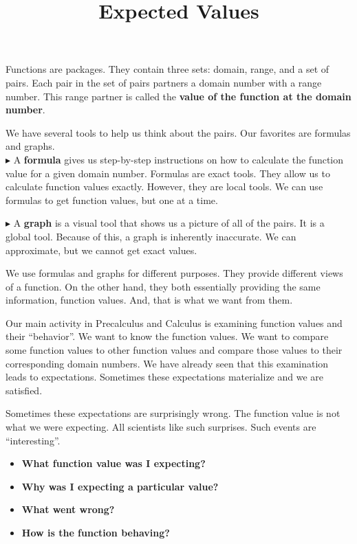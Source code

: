 \documentclass{ximera}
\title{Expected Values}
\begin{document}
\begin{abstract}

\end{abstract}
\maketitle




Functions are packages.  They contain three sets: domain, range, and a set of pairs.  Each pair in the set of pairs partners a domain number with a range number.  This range partner is called the \textbf{value of the function \textcolor{purple!85!blue}{at} the domain number}.


We have several tools to help us think about the pairs. Our favorites are formulas and graphs. \\


$\blacktriangleright$ A \textbf{\textcolor{purple!85!blue}{formula}} gives us step-by-step instructions on how to calculate the function value for a given domain number.   Formulas are exact tools. They allow us to calculate function values exactly. However, they are local tools.  We can use formulas to get function values, but one at a time.


$\blacktriangleright$ A \textbf{\textcolor{purple!85!blue}{graph}} is a visual tool that shows us a picture of all of the pairs.  It is a global tool. Because of this, a graph is inherently inaccurate.  We can approximate, but we cannot get exact values.  


We use formulas and graphs for different purposes. They provide different views of a function.  On the other hand, they both essentially providing the same information, function values. And, that is what we want from them.


Our main activity in Precalculus and Calculus is examining function values and their ``behavior''.  We want to know the function values.  We want to compare some function values to other function values and compare those values to their corresponding domain numbers.  We have already seen that this examination leads to expectations.  Sometimes these expectations materialize and we are satisfied.  

Sometimes these expectations are surprisingly wrong.  The function value is not what we were expecting. All scientists like such surprises. Such events are ``interesting''. 

\begin{itemize}
\item  \textbf{\textcolor{blue!75!black}{What function value was I expecting?}}
\item  \textbf{\textcolor{blue!75!black}{Why was I expecting a particular value?}}
\item  \textbf{\textcolor{blue!75!black}{What went wrong?}}
\item  \textbf{\textcolor{blue!75!black}{How is the function behaving?}}
\end{itemize} 
\end{document}

